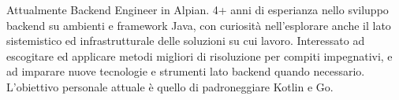 

\begin{cvparagraph}
	
	Attualmente Backend Engineer in Alpian. 4+ anni di esperianza nello sviluppo backend su ambienti e framework Java, con curiosità nell’esplorare anche il lato sistemistico ed infrastrutturale delle soluzioni su cui lavoro. Interessato ad escogitare ed applicare metodi migliori di risoluzione per compiti impegnativi, e ad imparare nuove tecnologie e strumenti lato backend quando necessario. L'obiettivo personale attuale è quello di padroneggiare Kotlin e Go.
\end{cvparagraph}